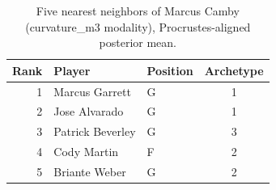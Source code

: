\begin{table}[htbp]
  \centering\small
  \begin{tabular}{rllc}
    \toprule
    Rank & Player & Position & Archetype \\
    \midrule
    1 & Marcus Garrett & G & 1 \\
    2 & Jose Alvarado & G & 1 \\
    3 & Patrick Beverley & G & 3 \\
    4 & Cody Martin & F & 2 \\
    5 & Briante Weber & G & 2 \\
    \bottomrule
  \end{tabular}
  \caption{Five nearest neighbors of Marcus Camby (curvature_m3 modality), Procrustes-aligned posterior mean.}
  \label{tab:Marcus_Camby_neighbors_curvature_m3}
\end{table}

